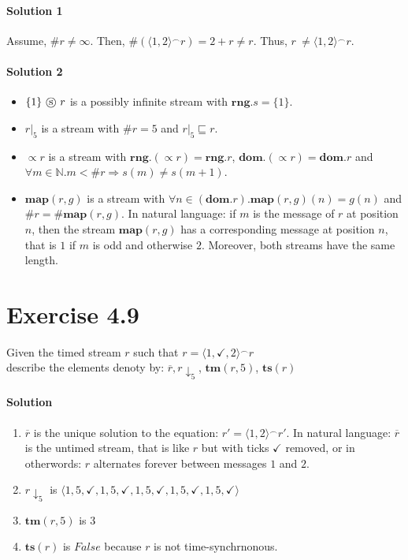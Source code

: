 \documentclass{article}[12pt]
\newcommand{\concat}{\ensuremath{^{\frown}}}
\newcommand{\stuterringremoval}{\ensuremath{\propto}}
\newcommand{\stream}[1]{\langle#1\rangle}
\newcommand{\naturals}{\ensuremath{\mathbb{N}}}
\newcommand{\prefixordering}{\ensuremath{\sqsubseteq}}
\newcommand{\length}{\ensuremath{\#}}
\newcommand{\filter}{\ \ensuremath{\text{\textcircled{s}}}\ }
\newcommand{\tm}{\ensuremath{\textbf{tm}}}
\newcommand{\ts}{\ensuremath{\textbf{ts}}}
\newcommand{\rng}{\ensuremath{\textbf{rng}}}
\newcommand{\dom}{\ensuremath{\textbf{dom}}}
\newcommand{\map}{\ensuremath{\textbf{map}}}
\begin{document}
    \paragraph{Solution 1}{
        Assume, $\length r \neq \infty$. Then, $\length(\stream{1,2} \concat r) = 2 + r \neq r$.
        Thus, $r \ \neq \stream{1,2} \concat r$.
    }
    \paragraph{Solution 2}{
        \begin{itemize}
            \item $\{1\} \filter r$ is a possibly infinite stream with $\rng.s = \{1\}$.
            \item $r|_5$ is a stream with $\length r = 5$ and $r|_5 \prefixordering r$.
            \item $\stuterringremoval r$ is a stream with $\rng.(\stuterringremoval r) = \rng.r$,
                $\dom.(\stuterringremoval r) = \dom.r$ and $\forall m \in \naturals. m < \length r \Rightarrow s(m) \neq s(m+1)$.
            \item $\map(r,g)$ is a stream with $\forall n \in (\dom.r) . \map(r,g)(n) = g(n)$ and $\length r = \length \map(r,g)$. In natural language: if $m$ is the message of $r$ at position $n$, then the stream $\map(r,g)$ has a corresponding message at position $n$, that is $1$ if $m$ is odd and otherwise $2$. Moreover, both streams  have the same length.
        \end{itemize}
    }

   \section{Exercise 4.9}
   Given the timed stream $r$ such that $r = \stream{1,\checkmark,2}\concat r$\\
   describe the elements denoty by: $\overline{r}, r\downarrow_{5}$, $\tm(r,5)$, $\ts(r)$
   \paragraph{Solution}
   \begin{enumerate}
        \item $\overline{r}$ is the unique solution to the equation: $r' = \stream{1,2} \concat r'$.
            In natural language: $\overline{r}$ is the untimed stream, that is like $r$ but with ticks $\checkmark$ removed, or in otherwords: $r$ alternates forever between messages $1$ and $2$.
        \item $r\downarrow_{5}$ is $\stream{1,5,\checkmark,1,5,\checkmark,1,5,\checkmark,1,5,\checkmark,1,5,\checkmark}$
        \item $\tm(r,5)$ is $3$
        \item $\ts(r)$ is $False$ because $r$ is not time-synchrnonous.
   \end{enumerate}
\end{document}
